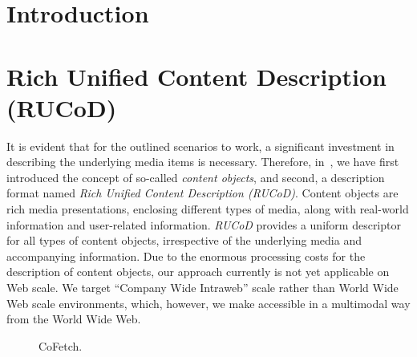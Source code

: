 \documentclass[runningheads,a4paper]{llncs}
\begin{document}
\section{Introduction}

\section{Rich Unified Content Description (RUCoD)}
It is evident that for the outlined scenarios to work, a significant investment in describing the underlying media items is necessary.
Therefore, in~\cite{ijmis2010}, we have first introduced the concept of so-called \emph{content objects}, and second, a description format named \emph{Rich Unified Content Description \mbox{(RUCoD)}}.
Content objects are rich media presentations, enclosing different types of media, along with real-world information and user-related information.
\mbox{\emph{RUCoD}} provides a uniform descriptor for all types of content objects, irrespective of the underlying media and accompanying information.
Due to the enormous processing costs for the description of content objects,
our approach currently is not yet applicable on Web scale.
We target ``Company Wide Intraweb'' scale rather than World Wide Web scale environments,
which, however, we make accessible in a multimodal way from the World Wide Web.

\begin{figure}[]
  \centering
    \qquad
\caption{CoFetch.}
\label{fig:cofetch}
\end{figure}



\end{document}
